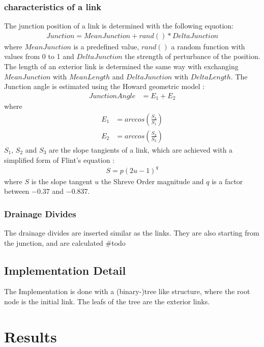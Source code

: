 \documentclass[11pt,a4paper]{article}
\begin{document}
\subsubsection{characteristics of a link}
The junction position of a link is determined with the following equotion:
\begin{align}
Junction = MeanJunction + rand() * DeltaJunction
\end{align} 
where $MeanJunction$ is a predefined value, $rand()$ a random function with
values from 0 to 1 and $DeltaJunction$ the strength of perturbance of the position.
The length of an exterior link is determined the same way with exchanging
$MeanJunction$ with $MeanLength$ and $DeltaJunction$ with $DeltaLength$.
The Junction angle is estimated using the Howard geometric model
\cite{howard1971optimal}:
\begin{align}
JunctionAngle &= E_1 + E_2
\end{align}
where
\begin{align}
E_1 &= arccos(\frac{S_3}{S_1}) \\
E_2 &= arccos(\frac{S_3}{S_2})
\end{align} 
$S_1$, $S_2$ and $S_3$ are the slope tangients of a link, which are achieved
with a simplified form of Flint's equation \cite{flint1974stream}:
\begin{align}
S = p(2u - 1)^q
\end{align}
where $S$ is the slope tangent $u$ the Shreve Order magnitude and $q$ is a
factor between $-0.37$ and $-0.837$.
\subsubsection{Drainage Divides}
The drainage divides are inserted similar as the links. They are also starting 
from the junction, and are calculated 
#todo
\subsection{Implementation Detail}
The Implementation is done with a (binary-)tree like structure, where the root
node is the initial link. The leafs of the tree are the exterior links.
\section{Results}


\newpage


\end{document}
